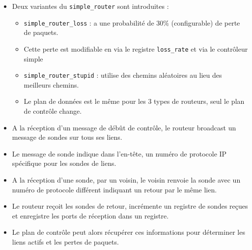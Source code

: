 \documentclass[12pt,a4paper]{report}
\begin{document}
        \begin{card}
            \begin{itemize}[left=0pt]
                \item Deux variantes du \texttt{simple\_router} sont introduites :
                \begin{itemize}[left=15pt]
                    \item \texttt{simple\_router\_loss} : a une probabilité de 30\% (configurable) de perte de paquets.
                    \item Cette perte est modifiable en via le registre \texttt{loss\_rate} et via le contrôleur simple
                    \item \texttt{simple\_router\_stupid} : utilise des chemins aléatoires au lieu des meilleurs chemins.
                    \item Le plan de données est le même pour les 3 types de routeurs, seul le plan de contrôle change.
                \end{itemize}
            \end{itemize}
        \end{card}

        \begin{card}
            \begin{itemize}[left=0pt]
                \item A la réception d'un message de débût de contrôle, le routeur broadcast un message de sondes sur tous ses liens.
                \item Le message de sonde indique dans l'en-tête, un numéro de protocole IP spécifique pour les sondes de liens.
                \item A la réception d'une sonde, par un voisin, le voisin renvoie la sonde avec un numéro de protocole différent indiquant un retour par le même lien.
                \item Le routeur reçoit les sondes de retour, incrémente un registre de sondes reçues et enregistre les ports de réception dans un registre.
                \item Le plan de contrôle peut alors récupérer ces informations pour déterminer les liens actifs et les pertes de paquets.
            \end{itemize}
        \end{card}
\end{document}
